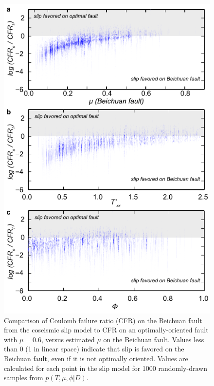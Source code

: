 \documentclass[twocolumn,jgrga]{AGUTeX}
\begin{document}
\begin{article}
\begin{figure}%
\centering
\includegraphics{../figures/cfr_plots.pdf}
\caption{Comparison of Coulomb failure ratio (CFR) on the Beichuan fault
from the \citet{zhang2011} coseismic slip model to CFR on an
optimally-oriented fault with $\mu = 0.6$, versus estimated $\mu$ on the
Beichuan fault. Values less than 0 (1 in linear space) indicate that
slip is favored on the Beichuan fault, even if it is not optimally
oriented. Values are calculated for each point in the slip model for
1000 randomly-drawn samples from $p(T,\mu,\phi |D)$.}
\label{fig:cfr_ratios}
\end{figure}


\end{article}
\end{document}
